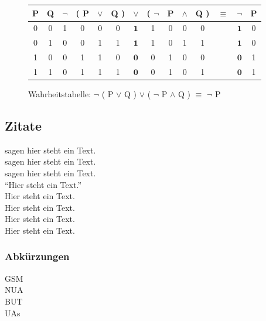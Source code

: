 \begin{figure}[!ht]
    \begin{center}
        \begin{tabular}{|c|c||c|c|c|c|c|c|c|c|c||c||c|c|}
            \hline
            P & Q & $\neg$ & ( P & $\vee$ & Q ) & $\vee$       & ( $\neg$ & P & $\wedge$ & Q ) & $\equiv$ & $\neg$       & P \\ \hline \hline
            0 & 0 & 1      & 0   & 0      & 0   & $\mathbf{1}$ & 1        & 0 & 0        & 0   &          & $\mathbf{1}$ & 0 \\ \hline
            0 & 1 & 0      & 0   & 1      & 1   & $\mathbf{1}$ & 1        & 0 & 1        & 1   &          & $\mathbf{1}$ & 0 \\ \hline
            1 & 0 & 0      & 1   & 1      & 0   & $\mathbf{0}$ & 0        & 1 & 0        & 0   &          & $\mathbf{0}$ & 1 \\ \hline
            1 & 1 & 0      & 1   & 1      & 1   & $\mathbf{0}$ & 0        & 1 & 0        & 1   &          & $\mathbf{0}$ & 1 \\ \hline
        \end{tabular}
        \caption{Wahrheitstabelle: $\neg$ ( P $\vee$ Q ) $\vee$ ( $\neg$ P $\wedge$ Q ) $\equiv$ $\neg$ P}
    \end{center}
\end{figure}

\subsection{Zitate}\label{subsec:zitate}
\cite{BarAhl08} sagen hier steht ein Text. \\
\textcite{BruMurPerWygMcN09} sagen hier steht ein Text. \\
\textcite*{BruMurPerWygMcN09} sagen hier steht ein Text. \\
"`Hier steht ein Text."' \autocite{BarAhl08} \\
Hier steht ein Text. \autocite[Vgl.][]{BarAhl08} \\
Hier steht ein Text. \autocite[][S. 200]{BruMurPerWygMcN09} \\
Hier steht ein Text. \autocite*[][S. 200]{BruMurPerWygMcN09} \\
Hier steht ein Text. \autocite{wiki:001,BruMurPerWygMcN09} \\

\subsubsection{Abkürzungen}
\acf{GSM} \\
\acs{NUA} \\
\acl{BUT}  \\
\acp{UA} \\



